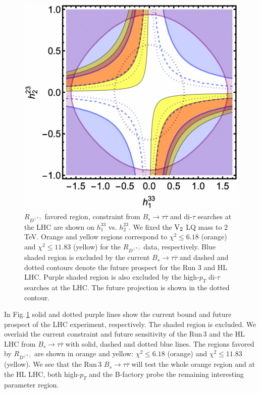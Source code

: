 \documentclass[12pt, a4paper]{article}
\numberwithin{equation}{section} %
\newcommand{\ov}{\overline}
\newcommand{\1}{\mbox{1}\hspace{-0.25em}\mbox{l}}
\begin{document}
\begin{figure}[t]
\begin{center}
 \includegraphics[width=0.45 \textwidth]{Figs/h133h223_min.pdf}
\end{center}
 \caption{
$R_{D^{(*)}}$ favored region, constraint from $B_s\to\tau\ov\tau$ and di-$\tau$ searches at the LHC are shown on $h_1^{33}$ vs. $h_2^{23}$.
We fixed the $\rm{V}_2$ LQ mass to 2\,TeV.
Orange and yellow regions correspond to $\chi^2\le6.18$ (orange) and $\chi^2\le11.83$ (yellow) for the $R_{D^{(*)}}$ data, respectively.
Blue shaded region is excluded by the current $B_s\to\tau\ov\tau$ and dashed and dotted contours denote the future prospect for the Run 3 and HL LHC.
Purple shaded region is also excluded by the high-$p_T$ di-$\tau$ searches at the LHC.
The future projection is shown in the dotted contour.
  \label{fig:h133_h223}
 }
\end{figure}

In Fig.\,\ref{fig:h133_h223} solid and dotted purple lines show the current bound and future prospect of the LHC experiment, respectively.
The shaded region is excluded.
We overlaid the current constraint and future sensitivity of the Run\,3 and the HL LHC from $B_s\to\tau\ov\tau$ with solid, dashed and dotted blue lines.
The regions favored by $R_{D^{(*)}}$ are shown in orange and yellow: $\chi^2\le6.18$ (orange) and $\chi^2\le11.83$ (yellow).
We see that the Run\,3 $B_s\to\tau\ov\tau$ will test the whole orange region and at the HL LHC, both high-$p_T$ and the B-factory probe the remaining interesting parameter region. 
\end{document}
